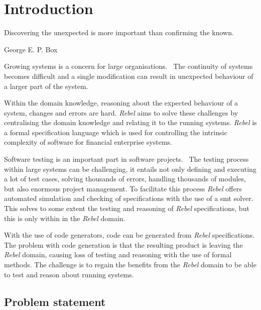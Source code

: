 \chapter{Introduction}

\epigraph{Discovering the unexpected is more important than confirming the
known.}{George E. P. Box}

Growing systems is a concern for large
organisations.~\cite[p.~1]{stoel_storm_vinju_bosman_2016} The continuity of
systems becomes difficult and a single modification can result in unexpected
behaviour of a larger part of the system.

Within the domain knowledge, reasoning about the expected behaviour of a system,
changes and errors are hard. \textit{Rebel} aims to solve these challenges by centralising the domain knowledge and relating
it to the running systems. \textit{Rebel} is a formal specification language which is
used for controlling the intrinsic complexity of software for financial
enterprise systems.~\cite[p.~1]{stoel_storm_vinju_bosman_2016}

Software testing is an important part in software projects.~\cite[p.~4]{myers2011art} The testing
process within large systems can be challenging, it entails not only defining
and executing a lot of test cases, solving thousands of errors, handling
thousands of modules, but also enormous project management. To facilitate this
process \textit{Rebel} offers automated simulation and checking of specifications with
the use of a \gls{smt} solver. This solves to some
extent the testing and reasoning of \textit{Rebel} specifications, but this is only
within in the \textit{Rebel} domain.

With the use of code generators, code can be
generated from \textit{Rebel} specifications. The problem with code generation is that the resulting
product is leaving the \textit{Rebel} domain, causing loss of testing and reasoning with
the use of formal methods. The challenge is to regain the benefits from the
\textit{Rebel} domain to be able to test and reason about running systems.

\section{Problem statement}\label{sec:problem-statement}


